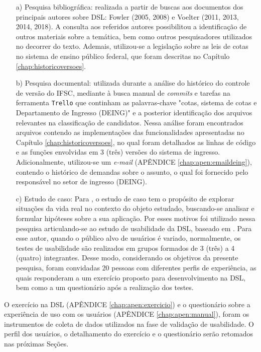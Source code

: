 \begin{enumerate}
    \item[a)] Pesquisa bibliográfica: realizada a partir de buscas aos documentos dos principais autores sobre \gls{DSL}: Fowler (2005, 2008) e Voelter (2011, 2013, 2014, 2018). A consulta aos referidos autores possibilitou a identificação de outros materiais sobre a temática, bem como outros pesquisadores utilizados no decorrer do texto. Ademais, utilizou-se a legislação sobre as leis de cotas no sistema de ensino público federal, que foram descritas no Capítulo \ref{chap:historicoversoes}. 

    
    \item[b)] Pesquisa documental: utilizada durante a análise do histórico do controle de versão do \gls{IFSC}, mediante à busca manual de \textit{commits} e tarefas na ferramenta \texttt{Trello} que continham as palavras-chave "cotas, sistema de cotas e Departamento de Ingresso (DEING)" e a posterior identificação dos arquivos relevantes na classificação de candidatos. Nessa análise foram encontrados arquivos contendo as implementações das funcionalidades apresentadas no Capítulo \ref{chap:historicoversoes}, no qual foram detalhados as linhas de código e as funções envolvidas em 3 (três) versões do sistema de ingresso. Adicionalmente, utilizou-se um \textit{e-mail} (APÊNDICE \ref{chap:apen:emaildeing}), contendo o histórico de demandas sobre o assunto, o qual foi fornecido pelo responsável no setor de ingresso (DEING).
    
    \item[c)] Estudo de caso: Para , o estudo de caso tem o propósito de explorar situações da vida real no contexto do objeto estudado, buscando-se analisar e formular hipóteses sobre a sua aplicação. Por esses motivos foi utilizado nessa pesquisa articulando-se ao estudo de usabilidade da \gls{DSL}, baseado em . Para esse autor, quando o público alvo de usuários é variado, normalmente, os testes de usabilidade são realizados em grupos formados de 3 (três) a 4 (quatro) integrantes. Desse modo, considerando os objetivos da presente pesquisa, foram convidadas 20 pessoas com diferentes perfis de experiência, as quais responderam a um exercício proposto para desenvolvimento na \gls{DSL}, bem como a um questionário após a realização dos testes. 
    
\end{enumerate}

    O exercício na DSL (APÊNDICE \ref{chap:apen:exercicio}) e o questionário sobre a experiência de uso com os usuários (APÊNDICE \ref{chap:apen:manual}), foram os instrumentos de coleta de dados utilizados na fase de validação de usabilidade. O perfil dos usuários, o detalhamento do exercício e o questionário serão retomados nas próximas Seções.
    
